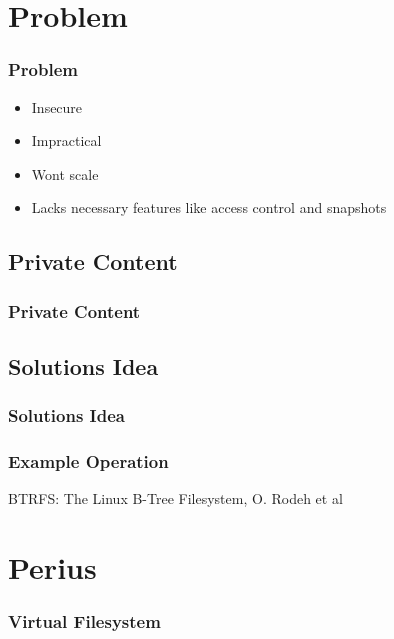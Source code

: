 \documentclass{beamer}
\begin{document}
\section{Problem}

\begin{frame}
  \frametitle{Problem}
  \begin{itemize}
    \item{Insecure} %
    \pause
    \item{Impractical} %
    \pause
    \item{Wont scale} %
    \pause
    \item{Lacks necessary features like access control and snapshots}
  \end{itemize}
\end{frame}

\subsection{Private Content}
\begin{frame}
  \frametitle{Private Content}
  \centerline{}
\end{frame}

\subsection{Solutions Idea}
\begin{frame}
  \frametitle{Solutions Idea}
  \centerline{}
\end{frame}
\begin{frame}
  \frametitle{Example Operation}
  \centerline{}
  \vspace{20pt}
  \centerline{\tiny{BTRFS: The Linux B-Tree Filesystem, O. Rodeh et al}}
\end{frame}

\section{Perius}
\begin{frame}
  \frametitle{Virtual Filesystem}
  \centerline{}
\end{frame}
\end{document}
